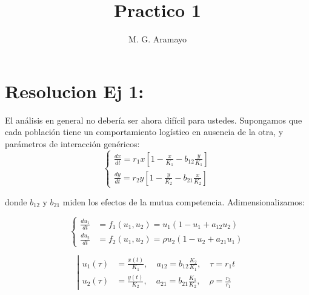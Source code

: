 \documentclass[twocolumn,aps,prl]{revtex4-1}
\begin{document}

\title{Practico 1}
\author{M. G. Aramayo}


\maketitle



\section{Resolucion Ej 1:}

El análisis en general no debería ser ahora difícil para ustedes. Supongamos que cada población tiene un comportamiento logístico en ausencia de la otra, y parámetros de interacción genéricos:
$$
\left\{
\begin{aligned}
    \frac{d x}{d t}=r_{1} x\left[1-\frac{x}{K_{1}}-b_{12} \frac{y}{K_{1}}\right] \\
    \frac{d y}{d t}=r_{2} y\left[1-\frac{y}{K_{2}}-b_{21} \frac{x}{K_{2}}\right]
\end{aligned}
\right.
$$

donde $b_{12}$ y $b_{21}$ miden los efectos de la mutua competencia. Adimensionalizamos:

$$
\left\{
\begin{aligned}
    \frac{d u_{1}}{d t} &= f_{1}\left(u_{1}, u_{2}\right) = u_{1}\left(1-u_{1}+a_{12} u_{2}\right) \\
    \frac{d u_{2}}{d t} &= f_{2}\left(u_{1}, u_{2}\right) = \rho u_{2}\left(1-u_{2}+a_{21} u_{1}\right)
\end{aligned}
\right.
$$

$$
\left\lvert 
\begin{aligned}
u_1(\tau) &= \frac{x(t)}{K_{1}}, \quad a_{12} = b_{12} \frac{K_{2}}{K_{1}}, \quad \tau=r_{1} t \\
u_2(\tau) &= \frac{y(t)}{K_{2}}, \quad a_{21} = b_{21} \frac{K_{1}}{K_{2}}, \quad \rho=\frac{r_{2}}{r_{1}}
\end{aligned}
\right.
$$
\end{document}
